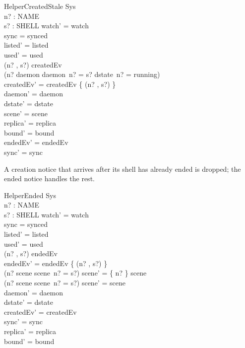 \documentclass[a4paper,10pt,fleqn]{article}
\begin{document}
\begin{schema}{HelperCreatedStale}
  \Delta Sys \\
  n? : NAME \\
  s? : SHELL
\where
  watch' = watch \\
  sync = synced \\
  listed' = listed \\
  used' = used \\
  (n? , s?) \in createdEv \\
  \lnot (n? \in \dom daemon \land daemon~n? = s?
    \land dstate~n? = running) \\
  createdEv' = createdEv \setminus \{ (n? , s?) \} \\
  daemon' = daemon \\
  dstate' = dstate \\
  scene' = scene \\
  replica' = replica \\
  bound' = bound \\
  endedEv' = endedEv \\
  sync' = sync
\end{schema}

A creation notice that arrives after its shell has already ended is
dropped; the ended notice handles the rest.

\begin{schema}{HelperEnded}
  \Delta Sys \\
  n? : NAME \\
  s? : SHELL
\where
  watch' = watch \\
  sync = synced \\
  listed' = listed \\
  used' = used \\
  (n? , s?) \in endedEv \\
  endedEv' = endedEv \setminus \{ (n? , s?) \} \\
  (n? \in \dom scene \land scene~n? = s?) \implies
    scene' = \{ n? \} \ndres scene \\
  \lnot (n? \in \dom scene \land scene~n? = s?) \implies
    scene' = scene \\
  daemon' = daemon \\
  dstate' = dstate \\
  createdEv' = createdEv \\
  sync' = sync \\
  replica' = replica \\
  bound' = bound
\end{schema}
\end{document}
